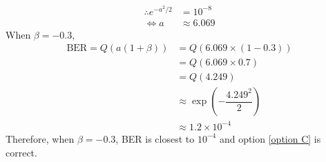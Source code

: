 \begin{align}
\therefore e^{-a^2 / 2} &= 10^{-8}\\
\Leftrightarrow a &\approx 6.069
\end{align}
When $\beta = -0.3$,
\begin{align}
\text{BER} = Q(a(1+\beta)) &= Q(6.069 \times (1-0.3))\\
&= Q(6.069 \times 0.7)\\
&= Q(4.249)\\
&\approx \exp (-\dfrac{4.249^2}{2})\\
&\approx 1.2 \times 10^{-4}
\end{align}
Therefore, when $\beta = -0.3$, BER is closest to $10^{-4}$ and option \ref{option C} is correct.

